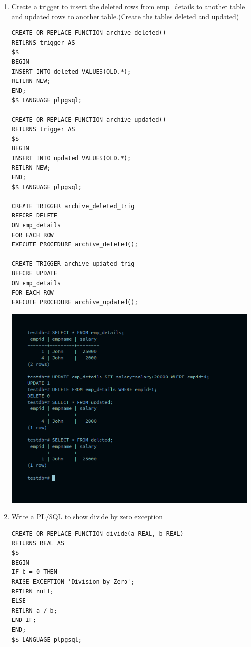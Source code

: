 \begin{enumerate}
\item Create a trigger to insert the deleted rows from emp\_details to another table and updated rows to another table.(Create the tables deleted and updated)
\begin{verbatim}
CREATE OR REPLACE FUNCTION archive_deleted()
RETURNS trigger AS
$$
BEGIN
INSERT INTO deleted VALUES(OLD.*);
RETURN NEW;
END;
$$ LANGUAGE plpgsql;

CREATE OR REPLACE FUNCTION archive_updated()
RETURNS trigger AS
$$
BEGIN
INSERT INTO updated VALUES(OLD.*);
RETURN NEW;
END;
$$ LANGUAGE plpgsql;

CREATE TRIGGER archive_deleted_trig
BEFORE DELETE
ON emp_details
FOR EACH ROW
EXECUTE PROCEDURE archive_deleted();

CREATE TRIGGER archive_updated_trig
BEFORE UPDATE
ON emp_details
FOR EACH ROW
EXECUTE PROCEDURE archive_updated();

\end{verbatim}

\newline
\includegraphics[width=\linewidth]{../Images/Triggers/4.png}

\item Write a PL/SQL to show divide by zero exception
\begin{verbatim}
CREATE OR REPLACE FUNCTION divide(a REAL, b REAL)
RETURNS REAL AS
$$
BEGIN
IF b = 0 THEN
RAISE EXCEPTION 'Division by Zero';
RETURN null;
ELSE
RETURN a / b;
END IF;
END;
$$ LANGUAGE plpgsql;

\end{verbatim}


\end{enumerate}
